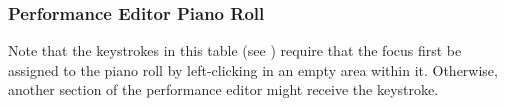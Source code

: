 \subsubsection{Performance Editor Piano Roll}
\label{subsubsec:kbd_mouse_performance_editor_piano_roll}


   Note that the keystrokes in this table
   (see )
   require that the focus first be
   assigned to the piano roll by left-clicking in an empty area within it.
   Otherwise, another section of the performance editor might receive the
   keystroke.

